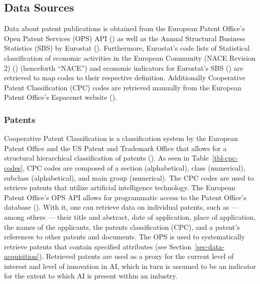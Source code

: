 \documentclass[
  12pt,
  a4paperpaper,
]{article}
\begin{document}
\subsection{Data Sources}\label{sec-data-sources}

Data about patent publications is obtained from the European Patent
Office's Open Patent Services (OPS) API
() as well as the Annual Structural Business Statistics (SBS) by
Eurostat
(). Furthermore, Eurostat's code lists of
Statistical classification of economic activities in the European
Community (NACE Revision 2)
() (henceforth ``NACE'') and economic
indicators for Eurostat's SBS
() are retrieved to map codes to their
respective definition. Additionally Cooperative Patent Classification
(CPC) codes are retrieved manually from the European Patent Office's
Espacenet website
().

\subsubsection{Patents}\label{patents}

Cooperative Patent Classification is a classification system by the
European Patent Office and the US Patent and Trademark Office that
allows for a structural hierarchical classification of patents
(). As seen in Table~\ref{tbl-cpc-codes}, CPC codes
are composed of a section (alphabetical), class (numerical), subclass
(alphabetical), and main group (numerical). The CPC codes are used to
retrieve patents that utilize artificial intelligence technology. The
European Patent Office's OPS API allows for programmatic access to the
Patent Office's database
(). With it, one can retrieve data on individual patents, such as
--- among others --- their title and abstract, date of application,
place of application, the names of the applicants, the patents
classification (CPC), and a patent's references to other patents and
documents. The OPS is used to systematically retrieve patents that
contain specified attributes (see Section~\ref{sec-data-acquisition}).
Retrieved patents are used as a proxy for the current level of interest
and level of innovation in AI, which in turn is assumed to be an
indicator for the extent to which AI is present within an industry.
\end{document}
